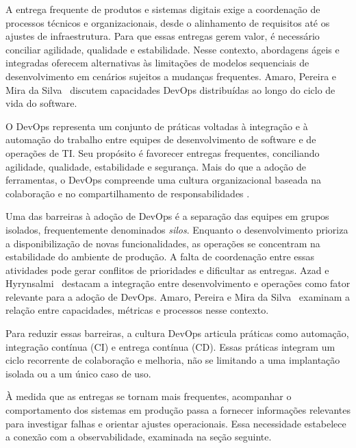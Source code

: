A entrega frequente de produtos e sistemas digitais exige a coordenação de
processos técnicos e organizacionais, desde o alinhamento de requisitos até
os ajustes de infraestrutura. Para que essas entregas gerem valor, é
necessário conciliar agilidade, qualidade e estabilidade. Nesse contexto,
abordagens ágeis e integradas oferecem alternativas às limitações de modelos
sequenciais de desenvolvimento em cenários sujeitos a mudanças frequentes.
Amaro, Pereira e Mira da Silva~ discutem capacidades
DevOps distribuídas ao longo do ciclo de vida do software.

O DevOps representa um conjunto de práticas voltadas à integração e à
automação do trabalho entre equipes de desenvolvimento de software e de
operações de TI. Seu propósito é favorecer entregas frequentes, conciliando
agilidade, qualidade, estabilidade e segurança. Mais do que a adoção de
ferramentas, o DevOps compreende uma cultura organizacional baseada na
colaboração e no compartilhamento de responsabilidades
\cite{azad2023,amaro2026}.

Uma das barreiras à adoção de DevOps é a separação das equipes em grupos
isolados, frequentemente denominados \emph{silos}. Enquanto o
desenvolvimento prioriza a disponibilização de novas funcionalidades,
as operações se concentram na estabilidade do ambiente de produção.
A falta de coordenação entre essas atividades pode gerar conflitos de
prioridades e dificultar as entregas. Azad e Hyrynsalmi~
destacam a integração entre desenvolvimento e operações como fator
relevante para a adoção de DevOps. Amaro, Pereira e Mira da
Silva~ examinam a relação entre capacidades, métricas
e processos nesse contexto.

Para reduzir essas barreiras, a cultura DevOps articula práticas como
automação, integração contínua (CI) e entrega contínua (CD). Essas práticas
integram um ciclo recorrente de colaboração e melhoria, não se limitando
a uma implantação isolada ou a um único caso de uso.

À medida que as entregas se tornam mais frequentes, acompanhar o
comportamento dos sistemas em produção passa a fornecer informações
relevantes para investigar falhas e orientar ajustes operacionais.
Essa necessidade estabelece a conexão com a observabilidade, examinada
na seção seguinte.
